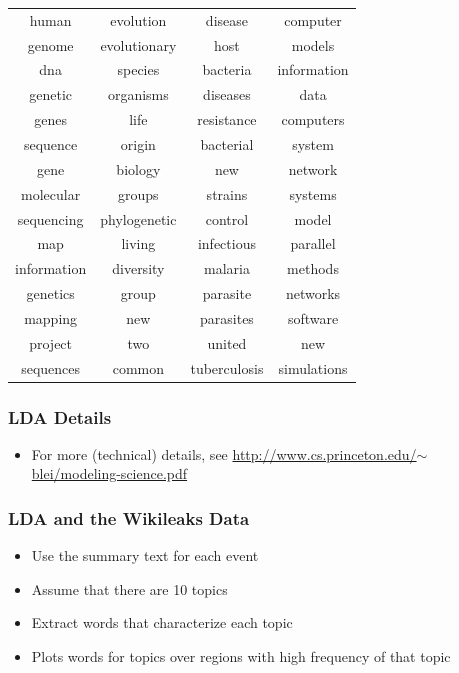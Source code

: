 \documentclass[xcolor=dvipsnames, 9pt]{beamer}
\begin{document}
\begin{frame}[fragile]
  \begin{center}
    \begin{tabular}{cccc}
      human & evolution & disease & computer \\
      genome & evolutionary & host & models \\
      dna & species & bacteria & information \\
      genetic & organisms & diseases & data \\
      genes & life & resistance & computers \\
      sequence & origin & bacterial & system \\
      gene & biology & new & network \\
      molecular & groups & strains & systems \\
      sequencing & phylogenetic & control & model \\
      map & living & infectious & parallel \\
      information & diversity & malaria & methods \\
      genetics & group & parasite & networks \\
      mapping & new & parasites & software \\
      project & two & united & new \\
      sequences & common & tuberculosis & simulations \\
    \end{tabular}
  \end{center}
\end{frame}

\begin{frame}[fragile]
  \frametitle{LDA Details}
  
  \begin{itemize}
    \item{For more (technical) details, see 
\href{http://www.cs.princeton.edu/$\sim$blei/modeling-science.pdf}{http://www.cs.princeton.edu/$\sim$blei/modeling-science.pdf}}
  \end{itemize}
\end{frame}

\begin{frame}[fragile]
  \frametitle{LDA and the Wikileaks Data}
  
  \begin{itemize}
    \item{Use the summary text for each event}
    \item{Assume that there are 10 topics}
    \item{Extract words that characterize each topic}
    \item{Plots words for topics over regions with high frequency of that topic}
  \end{itemize}
\end{frame}
\end{document}
